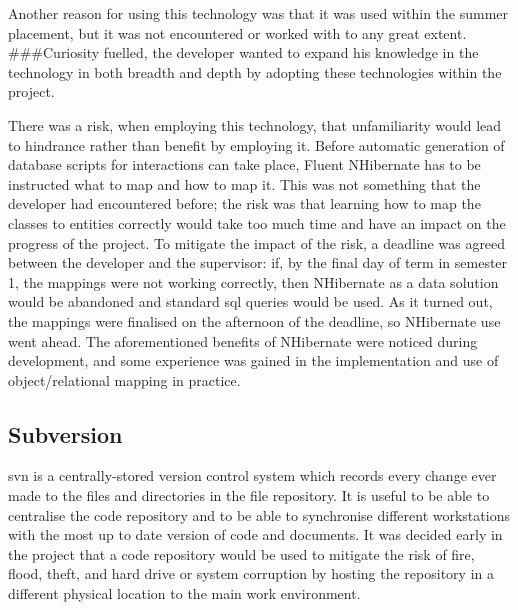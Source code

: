 \documentclass{l4proj}
\newcommand{\revisit}{\#\#\#}
\begin{document}
Another reason for using this technology was that it was used within the summer placement, but it was not encountered or worked with to any great extent.  \revisit Curiosity fuelled, the developer wanted to expand his knowledge in the technology in both breadth and depth by adopting these technologies within the project.

There was a risk, when employing this technology, that unfamiliarity would lead to hindrance rather than benefit by employing it.  Before automatic generation of database scripts for interactions can take place, Fluent NHibernate has to be instructed what to map and how to map it.  This was not something that the developer had encountered before; the risk was that learning how to map the classes to entities correctly would take too much time and have an impact on the progress of the project.  To mitigate the impact of the risk, a deadline was agreed between the developer and the supervisor: if, by the final day of term in semester 1, the mappings were not working correctly, then NHibernate as a data solution would be abandoned and standard \gls{sql} queries would be used.  As it turned out, the mappings were finalised on the afternoon of the deadline, so NHibernate use went ahead.  The aforementioned benefits of NHibernate were noticed during development, and some experience was gained in the implementation and use of object/relational mapping in practice.

\subsection{Subversion}
\label{svn}
\gls{svn} is a centrally-stored version control system which records every change ever made to the files and directories in the file repository\cite{CFP04c1}.  It is useful to be able to centralise the code repository and to be able to synchronise different workstations with the most up to date version of code and documents.  It was decided early in the project that a code repository would be used to mitigate the risk of fire, flood, theft, and hard drive or system corruption by hosting the repository in a different physical location to the main work environment.  
\end{document}
